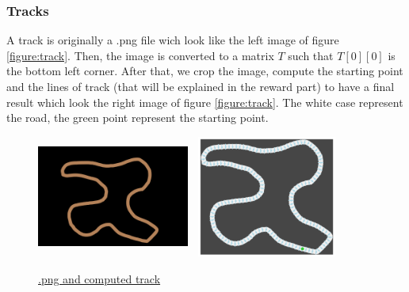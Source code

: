 \documentclass[11pt,a4paper]{article}
\newcounter{fig}
\begin{document}
			\subsubsection{Tracks}
A track is originally a .png file wich look like the left image of figure \ref{figure:track}. Then, the image is converted to a matrix $T$ such that $T[0][0]$ is the bottom left corner. After that, we crop the image, compute the starting point and the lines of track (that will be explained in the reward part) to have a final result which look the right image of figure \ref{figure:track}. The white case represent the road, the green point represent the starting point.
\begin{center}
\label{figure:track}
	\begin{figure}[ht]
		\centering
		\includegraphics[width=5cm, height=4cm]{track_06.png}
		\includegraphics[width=5cm, height=4cm]{track_06_computed.png}
		\caption{\underline{.png and computed track}}
	\end{figure}
\end{center}

	
\end{document}
